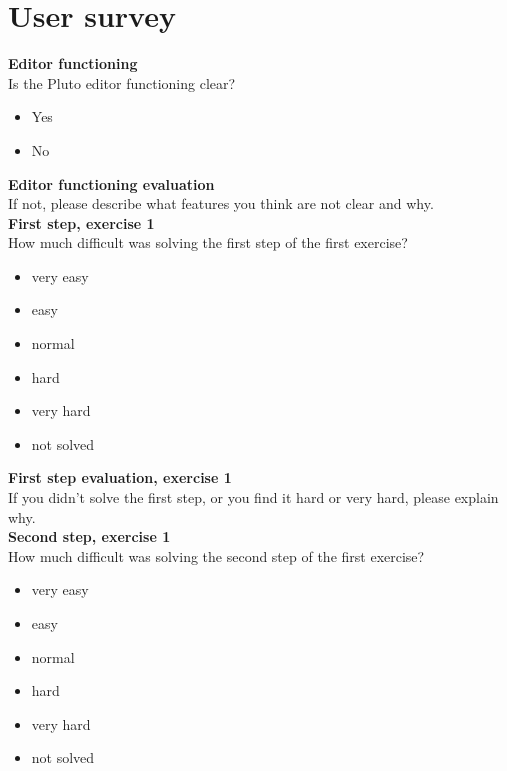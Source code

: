 \chapter{User survey}\label{appendixA}

\textbf{Editor functioning}
\\

Is the Pluto editor functioning clear?

 
\begin{itemize}
\item{Yes}
\item{No}
\end{itemize}


\textbf{Editor functioning evaluation}
\\

If not, please describe what features you think are not clear and why.
\\


\textbf{First step, exercise 1}
\\

How much difficult was solving the first step of the first exercise?


\begin{itemize}
\item{very easy}
\item{easy}
\item{normal}
\item{hard}
\item{very hard}
\item{not solved}

\end{itemize}


\textbf{First step evaluation, exercise 1}
\\

If you didn't solve the first step, or you find it hard or very hard, please explain why.
\\


\textbf{Second step, exercise 1}
\\

How much difficult was solving the second step of the first exercise?


\begin{itemize}
\item{very easy}
\item{easy}
\item{normal}
\item{hard}
\item{very hard}
\item{not solved}

\end{itemize}
 

